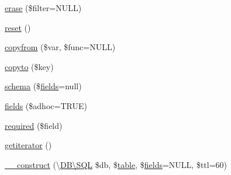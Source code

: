 \begin{DoxyCompactItemize}
\item 
\hyperlink{class_d_b_1_1_s_q_l_1_1_mapper_aa7210074cfc1eda78dc492d8b8a96616}{erase} (\$filter=N\+U\+LL)
\item 
\hyperlink{class_d_b_1_1_s_q_l_1_1_mapper_a4a20559544fdf4dcb457e258dc976cf8}{reset} ()
\item 
\hyperlink{class_d_b_1_1_s_q_l_1_1_mapper_adffe904ab38af888d9b033647ec6d935}{copyfrom} (\$var, \$func=N\+U\+LL)
\item 
\hyperlink{class_d_b_1_1_s_q_l_1_1_mapper_a4bcf54f913758fb093c35ea81fc29615}{copyto} (\$key)
\item 
\hyperlink{class_d_b_1_1_s_q_l_1_1_mapper_a559eb01be1295928258bd765e1221142}{schema} (\$\hyperlink{class_d_b_1_1_s_q_l_1_1_mapper_a10174b3b4ef6bf0883a0246fa3ac2f8d}{fields}=null)
\item 
\hyperlink{class_d_b_1_1_s_q_l_1_1_mapper_a10174b3b4ef6bf0883a0246fa3ac2f8d}{fields} (\$adhoc=T\+R\+UE)
\item 
\hyperlink{class_d_b_1_1_s_q_l_1_1_mapper_ab7379056ffedc01b4f9688847bf83ad8}{required} (\$field)
\item 
\hyperlink{class_d_b_1_1_s_q_l_1_1_mapper_a7f835c25df4cb49d02328644722656da}{getiterator} ()
\item 
\hyperlink{class_d_b_1_1_s_q_l_1_1_mapper_acbebed6a28c69e88f6a2afe423fbf778}{\+\_\+\+\_\+construct} (\textbackslash{}\hyperlink{class_d_b_1_1_s_q_l}{D\+B\textbackslash{}\+S\+QL} \$db, \$\hyperlink{class_d_b_1_1_s_q_l_1_1_mapper_a5aa7b43c8ec77df216a71a27da0a321c}{table}, \$\hyperlink{class_d_b_1_1_s_q_l_1_1_mapper_a10174b3b4ef6bf0883a0246fa3ac2f8d}{fields}=N\+U\+LL, \$ttl=60)
\end{DoxyCompactItemize}
